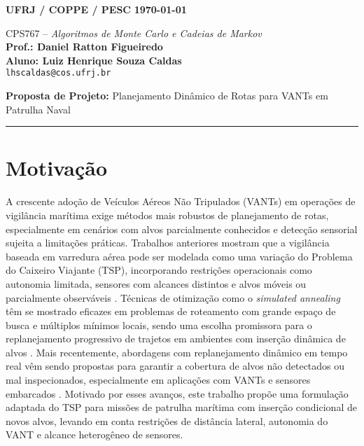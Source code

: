 \documentclass[12 pt]{article}
\begin{document}
\noindent
\textbf{UFRJ / COPPE / PESC} \hfill \textbf{\today} \\



\begin{center}
CPS767 – \textit{Algoritmos de Monte Carlo e Cadeias de Markov}\\
\textbf{Prof.: Daniel Ratton Figueiredo} \\[1em]
\textbf{Aluno: Luiz Henrique Souza Caldas}\\ \texttt{lhscaldas@cos.ufrj.br} \\[1em]

\end{center}

\textbf{Proposta de Projeto:} Planejamento Dinâmico de Rotas para VANTs em Patrulha Naval

\vspace{1em}
\hrule
\vspace{2em}


\section{Motivação}
A crescente adoção de Veículos Aéreos Não Tripulados (VANTs) em operações de vigilância marítima exige métodos mais robustos de planejamento de rotas, especialmente em cenários com alvos parcialmente conhecidos e detecção sensorial sujeita a limitações práticas. Trabalhos anteriores mostram que a vigilância baseada em varredura aérea pode ser modelada como uma variação do Problema do Caixeiro Viajante (TSP), incorporando restrições operacionais como autonomia limitada, sensores com alcances distintos e alvos móveis ou parcialmente observáveis \cite{marlow_2007}. Técnicas de otimização como o \textit{simulated annealing} têm se mostrado eficazes em problemas de roteamento com grande espaço de busca e múltiplos mínimos locais, sendo uma escolha promissora para o replanejamento progressivo de trajetos em ambientes com inserção dinâmica de alvos \cite{kosmas_2012}. Mais recentemente, abordagens com replanejamento dinâmico em tempo real vêm sendo propostas para garantir a cobertura de alvos não detectados ou mal inspecionados, especialmente em aplicações com VANTs e sensores embarcados \cite{penicka_2017}. Motivado por esses avanços, este trabalho propõe uma formulação adaptada do TSP para missões de patrulha marítima com inserção condicional de novos alvos, levando em conta restrições de distância lateral, autonomia do VANT e alcance heterogêneo de sensores.
\end{document}
